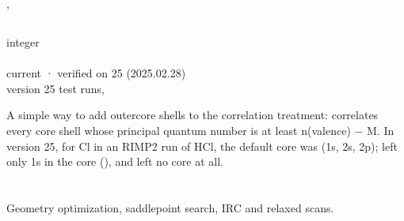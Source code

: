 \documentclass[letterpaper,10pt,english,openany,oneside]{sphinxmanual}
\begin{document}
\sphinxAtStartPar
{}

\begin{sphinxVerbatim}[commandchars=\\\{\}]
\end{sphinxVerbatim}

\sphinxAtStartPar
{} {\hyperref[\detokenize{reference/scf:scf-core}]{}}, {\hyperref[\detokenize{reference/atoms:atoms-mcore}]{}}


\subsection{}
\label{\detokenize{reference/atoms:mcore}}\label{\detokenize{reference/atoms:atoms-mcore}}
\ignorespaces 
\sphinxAtStartPar
{} integer\\
 \\
 current · verified on 25 (2025.02.28)\\
 version 25 test runs, 

\sphinxAtStartPar
A simple way to add outer\sphinxhyphen{}core shells to the correlation treatment:  correlates every core shell
whose principal quantum number is at least n(valence) − M. In version 25, for Cl in an RI\sphinxhyphen{}MP2 run of HCl, the
default core was  (1s, 2s, 2p);  left only 1s in the core (), and
 left no core at all.

\sphinxAtStartPar
{} {\hyperref[\detokenize{reference/atoms:atoms-core}]{}}

\sphinxstepscope




\section{}
\label{\detokenize{reference/optimize:optimize}}\label{\detokenize{reference/optimize:group-optimize}}\label{\detokenize{reference/optimize::doc}}
\ignorespaces 
\sphinxAtStartPar
Geometry optimization, saddle\sphinxhyphen{}point search, IRC and relaxed scans.
\end{document}
